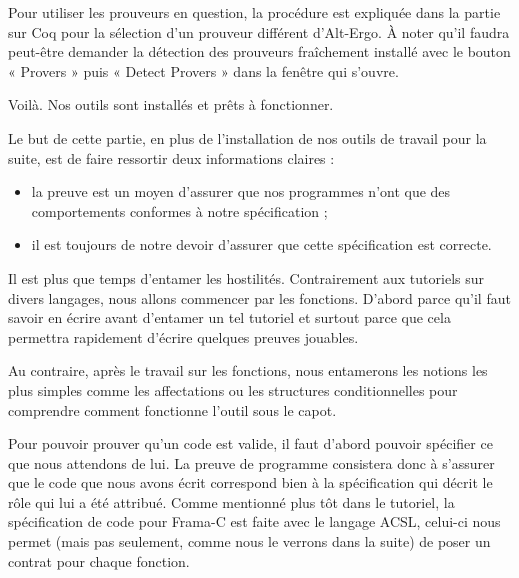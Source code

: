 \documentclass[middle]{zmdocument}
\begin{document}
Pour utiliser les prouveurs en question, la procédure est expliquée dans la partie
sur Coq pour la sélection d'un prouveur différent d'Alt-Ergo. À noter qu'il faudra
peut-être demander la détection des prouveurs fraîchement installé avec le 
bouton « Provers » puis « Detect Provers » dans la fenêtre qui s'ouvre.



\horizontalLine



Voilà. Nos outils sont installés et prêts à fonctionner.



Le but de cette partie, en plus de l'installation de nos outils de travail
pour la suite, est de faire ressortir deux informations claires :



\begin{itemize}
\item la preuve est un moyen d'assurer que nos programmes n'ont que des 
comportements conformes à notre spécification ;
\item il est toujours de notre devoir d'assurer que cette spécification est
correcte.
\end{itemize}




Il est plus que temps d'entamer les hostilités. Contrairement aux tutoriels 
sur divers langages, nous allons commencer par les fonctions. D'abord parce 
qu'il faut savoir en écrire avant d'entamer un tel tutoriel et surtout 
parce que cela permettra rapidement d'écrire quelques preuves jouables.



Au contraire, après le travail sur les fonctions, nous entamerons les notions 
les plus simples comme les affectations ou les structures conditionnelles pour 
comprendre comment fonctionne l'outil sous le capot.



Pour pouvoir prouver qu'un code est valide, il faut d'abord pouvoir spécifier 
ce que nous attendons de lui. La preuve de programme consistera donc à s'assurer 
que le code que nous avons écrit correspond bien à la spécification qui décrit
le rôle qui lui a été attribué. Comme mentionné plus tôt dans le tutoriel, la 
spécification de code pour Frama-C est faite avec le langage ACSL, celui-ci 
nous permet (mais pas seulement, comme nous le verrons dans la suite) de poser
un contrat pour chaque fonction.
\end{document}
